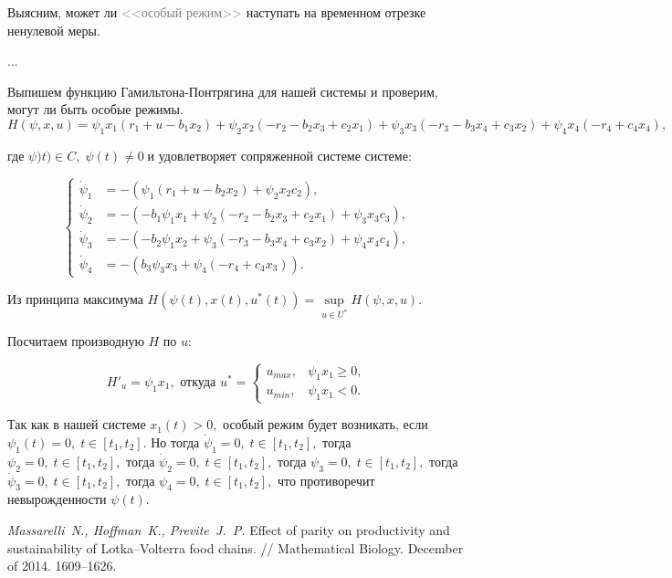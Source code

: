 \documentclass[11pt]{article}
\begin{document}
Выясним, может ли \textcolor{gray}{<<особый режим>>} наступать на временном отрезке ненулевой меры.

...

Выпишем функцию Гамильтона-Понтрягина для нашей системы и проверим, могут ли быть особые режимы.
$$H(\psi, x, u) = \psi_1x_1(r_1 + u - b_1x_2) + \psi_2x_2(-r_2 - b_2x_3 + c_2x_1) + \psi_3x_3(-r_3 - b_3x_4 + c_3x_2) + \psi_4x_4(-r_4 + c_4x_4),$$

где  $\psi)t) \in C, \; \psi(t) \ne 0 \; \text{и удовлетворяет сопряженной системе системе:}$

$$
\left\{
\begin{aligned}
	\dot \psi_1 &= -(\psi_1(r_1 + u - b_2x_2) + \psi_2x_2c_2), \\
	\dot \psi_2 &= -(-b_1\psi_1x_1 + \psi_2(-r_2 - b_2x_3 + c_2x_1) + \psi_3x_3c_3), \\
	\dot \psi_3 &= -(-b_2\psi_1x_2 + \psi_3(-r_3 - b_3x_4 + c_3x_2) + \psi_4x_4c_4), \\
	\dot \psi_4 &= -(b_3\psi_3x_3 + \psi_4(-r_4 + c_4x_3)).
\end{aligned}
\right.$$

Из принципа максимума $H(\psi(t), x(t), u^*(t)) = \sup\limits_{u \in U^*} H(\psi,x,u).$

Посчитаем производную $H$ по $u:$

$$H'_u = \psi_1x_1, \text{ откуда } u^* = \begin{cases} u_{max}, & \psi_1x_1 \geqslant 0, \\  u_{min}, & \psi_1x_1 < 0.\end{cases}$$

Так как в нашей системе $x_1(t) > 0,$ особый режим будет возникать, если $\psi_1(t) = 0, \; t \in [t_1, t_2].$ 
Но тогда $\dot \psi_1 = 0, \;  t \in [t_1, t_2],$ тогда $\psi_2 = 0, \;  t \in [t_1, t_2],$ тогда $\dot \psi_2 = 0, \;  t \in [t_1, t_2],$ тогда $\psi_3 = 0, \;  t \in [t_1, t_2],$ тогда $\dot \psi_3 = 0, \;  t \in [t_1, t_2],$ тогда $\psi_4 = 0, \;  t \in [t_1, t_2],$ что противоречит невырожденности $\psi(t).$
%
%


\clearpage
\newpage
\begin{thebibliography}{0}
 {\it Massarelli~N., Hoffman~K., Previte~J.~P.} Effect of parity on productivity and sustainability of Lotka–Volterra food chains. // Mathematical Biology. December of 2014. 1609--1626.
\end{thebibliography}
\end{document}
